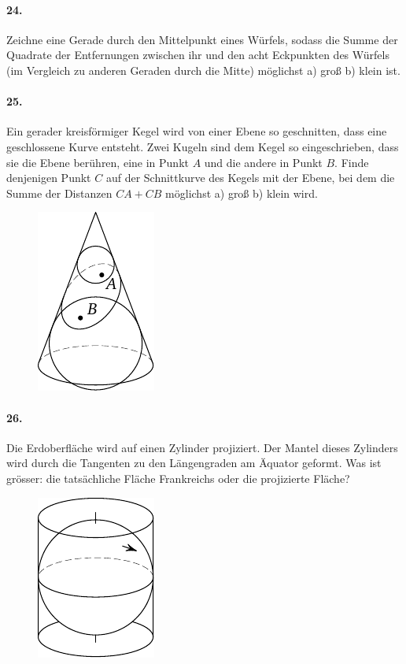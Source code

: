 \documentclass[10pt,a5paper,twoside]{article}
\newenvironment{problem}[1]{\paragraph*{#1}}{}
\begin{document}
\begin{problem}{24.}
	Zeichne eine Gerade durch den Mittelpunkt eines Würfels, sodass die Summe der Quadrate der Entfernungen zwischen ihr und den acht Eckpunkten des Würfels (im Vergleich zu anderen Geraden durch die Mitte) möglichst a) groß b) klein ist.
\end{problem}

\begin{problem}{25.}
	Ein gerader kreisförmiger Kegel wird von einer Ebene so geschnitten, dass eine geschlossene Kurve entsteht. Zwei Kugeln sind dem Kegel so eingeschrieben, dass sie die Ebene berühren, eine in Punkt $A$ und die andere in Punkt $B$. Finde denjenigen Punkt $C$ auf der Schnittkurve des Kegels mit der Ebene, bei dem die Summe der Distanzen $CA + CB$ möglichst a) groß b) klein wird. 
	\begin{figure}[H]
	\centering
	\footnotesize
	\includegraphics[scale=1]{taskbook-9}
	\end{figure} 
\end{problem}

\begin{problem}{26.}
	Die Erdoberfläche wird auf einen Zylinder projiziert. Der Mantel dieses Zylinders wird durch die Tangenten zu den Längengraden am Äquator geformt. Was ist grösser: die tatsächliche Fläche Frankreichs oder die projizierte Fläche?
	\begin{figure}[H]
	\centering
	\footnotesize
	\includegraphics[scale=1]{taskbook-10}
	\end{figure}
\end{problem}
\end{document}

